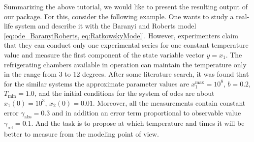 \documentclass[10pt,A4paper]{article}
\begin{document}
Summarizing the above tutorial, we would like to present the resulting output of our package.
For this, consider the following example.
One wants to study a real-life system and describe it with the Baranyi and Roberts model \ref{eq:ode_BaranyiRoberts, eq:RatkowskyModel}.
However, experimenters claim that they can conduct only one experimental series for one constant temperature value and measure the first component of the state variable vector $y = x_1$.
The refrigerating chambers available in operation can maintain the temperature only in the range from 3 to 12 degrees.
After some literature search, it was found that for the similar systems the approximate parameter values are $x_1^\text{max}=10^8$, $b=0.2$, $T_\text{min}=1.0$,
and the initial conditions for the system of \acp{ode} are about $x_1(0) = 10^3$, $x_2(0)=0.01$.
Moreover, all the measurements contain constant error $\gamma_\text{abs}=0.3$ and in addition an error term proportional to observable value $\gamma_\text{rel}=0.1$.
And the task is to propose at which temperature and times it will be better to measure from the modeling point of view.
\end{document}
